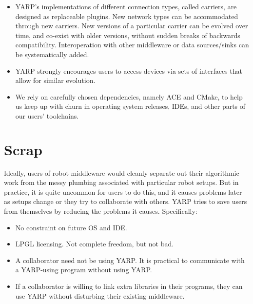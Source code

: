 \documentclass[letterpaper]{article}
\begin{document}
\begin{itemize}

\item YARP's implementations of different connection types, called
carriers, are designed as replaceable plugins.  New network types can
be accommodated through new carriers.  New versions of a particular
carrier can be evolved over time, and co-exist with older versions,
without sudden breaks of backwards compatibility.  Interoperation
with other middleware or data sources/sinks can be systematically
added.

\item YARP strongly encourages users to access devices via sets of
interfaces that allow for similar evolution.

\item We rely on carefully chosen dependencies, namely ACE and CMake,
to help us keep up with churn in operating system releases, IDEs, and
other parts of our users' toolchains.

\end{itemize}

\section{Scrap}


Ideally, users of robot middleware would cleanly separate out their
algorithmic work from the messy plumbing associated with particular
robot setups.  But in practice, it is quite uncommon for users to do
this, and it causes problems later as setups change or they try to
collaborate with others.  YARP tries to save users from themselves
by reducing the problems it causes.  Specifically:

\begin{itemize}

\item No constraint on future OS and IDE.

\item LPGL licensing.  Not complete freedom, but not bad.

\item A collaborator need not be using YARP.  It is practical to
communicate with a YARP-using program without using YARP.

\item If a collaborator is willing to link extra libraries in their
programs, they can use YARP without disturbing their existing
middleware.

\end{itemize}
\end{document}
